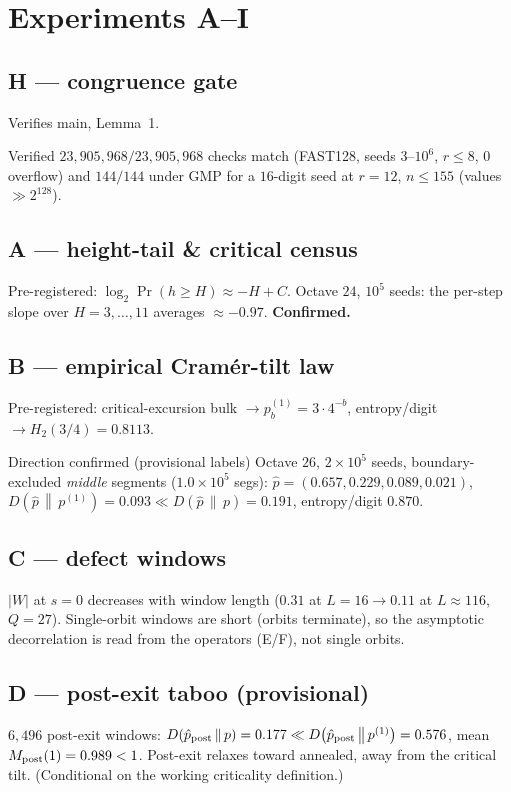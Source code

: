 \documentclass[11pt]{article}
\newcommand{\KL}[2]{D\!\left(#1\,\middle\|\,#2\right)}
\theoremstyle{remark}
\begin{document}
\section{Experiments A--I}

\subsection*{H --- congruence gate}
Verifies main, Lemma~1.
\begin{findingbox}{Verified}
$23{,}905{,}968/23{,}905{,}968$ checks match (FAST128, seeds $3$--$10^6$, $r\le8$,
$0$ overflow) and $144/144$ under GMP for a $16$-digit seed at $r=12$, $n\le155$
(values $\gg2^{128}$).
\end{findingbox}

\subsection*{A --- height-tail \& critical census}
Pre-registered: $\log_2\Pr(h\ge H)\approx-H+C$. Octave $24$, $10^5$ seeds: the
per-step slope over $H=3,\dots,11$ averages $\approx-0.97$. \textbf{Confirmed.}

\subsection*{B --- empirical Cram\'er-tilt law}
Pre-registered: critical-excursion bulk $\to p^{(1)}_b=3\cdot4^{-b}$,
entropy/digit $\to H_2(3/4)=0.8113$.
\begin{findingbox}{Direction confirmed (provisional labels)}
Octave $26$, $2\times10^5$ seeds, boundary-excluded \emph{middle} segments
($1.0\times10^5$ segs): $\hat p=(0.657,0.229,0.089,0.021)$,
$\KL{\hat p}{p^{(1)}}=0.093\ll\KL{\hat p}{p}=0.191$, entropy/digit $0.870$.
\end{findingbox}

\subsection*{C --- defect windows}
$|W|$ at $s=0$ decreases with window length ($0.31$ at $L{=}16\to0.11$ at
$L{\approx}116$, $Q=27$). Single-orbit windows are short (orbits terminate), so
the asymptotic decorrelation is read from the operators (E/F), not single orbits.

\subsection*{D --- post-exit taboo (provisional)}
$6{,}496$ post-exit windows: $\KL{\hat p_{\rm post}}{p}=0.177\ll
\KL{\hat p_{\rm post}}{p^{(1)}}=0.576$, mean $M_{\rm post}(1)=0.989<1$. Post-exit
relaxes toward annealed, away from the critical tilt. (Conditional on the
working criticality definition.)
\end{document}
